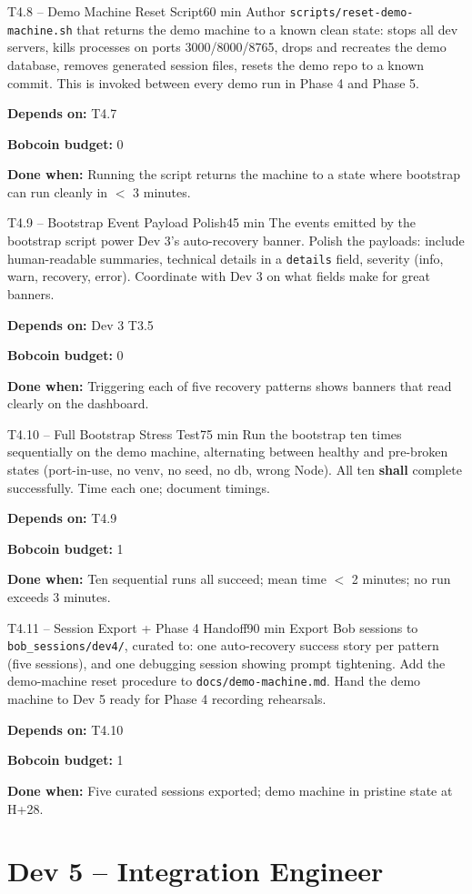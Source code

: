 \documentclass[11pt,letterpaper]{article}
\newcommand{\acceptance}[1]{\par\smallskip\textcolor{ibmgreen}{\textbf{Done when:}} #1}
\newcommand{\depends}[1]{\par\smallskip\textcolor{ibmorange}{\textbf{Depends on:}} #1}
\newcommand{\bobcost}[1]{\par\smallskip\textcolor{ibmaccent}{\textbf{Bobcoin budget:}} #1}
\newcommand{\shall}{\textbf{shall}}
\begin{document}
\begin{task}{T4.8 -- Demo Machine Reset Script}{60 min}
Author \texttt{scripts/reset-demo-machine.sh} that returns the demo machine to a known clean state: stops all dev servers, kills processes on ports 3000/8000/8765, drops and recreates the demo database, removes generated session files, resets the demo repo to a known commit. This is invoked between every demo run in Phase 4 and Phase 5.
\depends{T4.7}
\bobcost{0}
\acceptance{Running the script returns the machine to a state where bootstrap can run cleanly in $<$ 3 minutes.}
\end{task}

\begin{task}{T4.9 -- Bootstrap Event Payload Polish}{45 min}
The events emitted by the bootstrap script power Dev 3's auto-recovery banner. Polish the payloads: include human-readable summaries, technical details in a \texttt{details} field, severity (info, warn, recovery, error). Coordinate with Dev 3 on what fields make for great banners.
\depends{Dev 3 T3.5}
\bobcost{0}
\acceptance{Triggering each of five recovery patterns shows banners that read clearly on the dashboard.}
\end{task}

\begin{task}{T4.10 -- Full Bootstrap Stress Test}{75 min}
Run the bootstrap ten times sequentially on the demo machine, alternating between healthy and pre-broken states (port-in-use, no venv, no seed, no db, wrong Node). All ten \shall{} complete successfully. Time each one; document timings.
\depends{T4.9}
\bobcost{1}
\acceptance{Ten sequential runs all succeed; mean time $<$ 2 minutes; no run exceeds 3 minutes.}
\end{task}

\begin{task}{T4.11 -- Session Export + Phase 4 Handoff}{90 min}
Export Bob sessions to \texttt{bob\_sessions/dev4/}, curated to: one auto-recovery success story per pattern (five sessions), and one debugging session showing prompt tightening. Add the demo-machine reset procedure to \texttt{docs/demo-machine.md}. Hand the demo machine to Dev 5 ready for Phase 4 recording rehearsals.
\depends{T4.10}
\bobcost{1}
\acceptance{Five curated sessions exported; demo machine in pristine state at H+28.}
\end{task}

\section{Dev 5 -- Integration Engineer}
\end{document}
